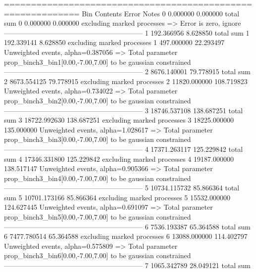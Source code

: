 ============================================================
Bin        Contents        Error           Notes                         
0          0.000000        0.000000        total sum                     
0          0.000000        0.000000        excluding marked processes    
  => Error is zero, ignore      
------------------------------------------------------------
1          192.366956      8.628850        total sum                     
1          192.339141      8.628850        excluding marked processes    
1          497.000000      22.293497       Unweighted events, alpha=0.387056
  => Total parameter prop_binch3_bin1[0.00,-7.00,7.00] to be gaussian constrained
------------------------------------------------------------
2          8676.140001     79.778915       total sum                     
2          8673.554125     79.778915       excluding marked processes    
2          11820.000000    108.719823      Unweighted events, alpha=0.734022
  => Total parameter prop_binch3_bin2[0.00,-7.00,7.00] to be gaussian constrained
------------------------------------------------------------
3          18746.537108    138.687251      total sum                     
3          18722.992630    138.687251      excluding marked processes    
3          18225.000000    135.000000      Unweighted events, alpha=1.028617
  => Total parameter prop_binch3_bin3[0.00,-7.00,7.00] to be gaussian constrained
------------------------------------------------------------
4          17371.263117    125.229842      total sum                     
4          17346.331800    125.229842      excluding marked processes    
4          19187.000000    138.517147      Unweighted events, alpha=0.905366
  => Total parameter prop_binch3_bin4[0.00,-7.00,7.00] to be gaussian constrained
------------------------------------------------------------
5          10734.115732    85.866364       total sum                     
5          10701.173166    85.866364       excluding marked processes    
5          15532.000000    124.627445      Unweighted events, alpha=0.691097
  => Total parameter prop_binch3_bin5[0.00,-7.00,7.00] to be gaussian constrained
------------------------------------------------------------
6          7536.193387     65.364588       total sum                     
6          7477.780514     65.364588       excluding marked processes    
6          13088.000000    114.402797      Unweighted events, alpha=0.575809
  => Total parameter prop_binch3_bin6[0.00,-7.00,7.00] to be gaussian constrained
------------------------------------------------------------
7          1065.342789     28.049121       total sum                     
